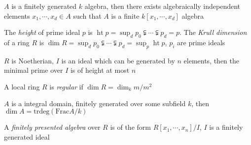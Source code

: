 \documentclass[main]{subfiles}
\begin{document}
\begin{lemma}\label{Noether's normalization lemma}
$A$ is a finitely generated $k$ algebra, then there exists algebraically independent elements $x_1,\cdots,x_d\in A$ such that $A$ is a finite $k[x_1,\cdots,x_d]$ algebra
\end{lemma}

\begin{definition}
The \textit{height} of prime ideal $p$ is $\operatorname{ht} p=\displaystyle\sup_dp_0\subsetneqq\cdots\subsetneqq p_d=p$. The \textit{Krull dimension} of a ring $R$ is $\displaystyle\dim R=\sup_d p_0\subsetneqq\cdots\subsetneqq p_d=\sup_p\operatorname{ht} p$, $p_i$ are prime ideals
\end{definition}

\begin{theorem}
$R$ is Noetherian, $I$ is an ideal which can be generated by $n$ elements, then the minimal prime over $I$ is of height at most $n$
\end{theorem}

\begin{definition}
A local ring $R$ is \textit{regular} if $\dim R=\dim_km/m^2$
\end{definition}

\begin{proposition}
$A$ is a integral domain, finitely generated over some subfield $k$, then $\dim A=\mathrm{trdeg}(\mathrm{Frac}A/k)$
\end{proposition}

\begin{definition}
A \textit{finitely presented algebra} over $R$ is of the form $R[x_1,\cdots,x_n]/I$, $I$ is a finitely generated ideal
\end{definition}
\end{document}
